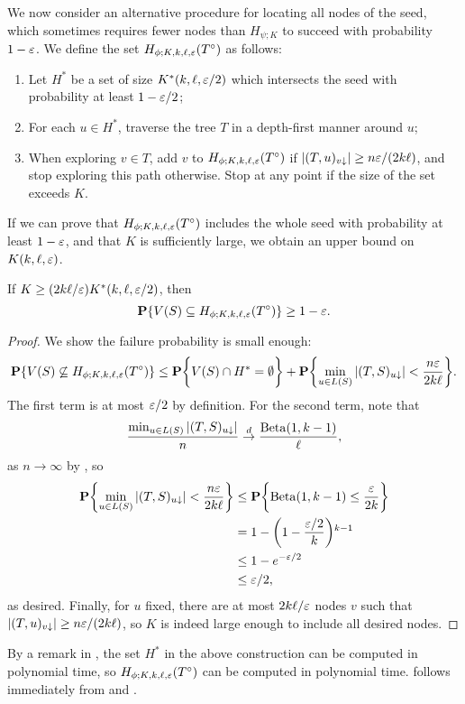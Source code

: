 We now consider an alternative procedure for locating all nodes of the
seed, which sometimes requires fewer nodes than $H_{\psi; K}$ to
succeed with probability $1 - \varepsilon$. We define the set
$H_{\phi; K, k, \ell, \varepsilon}(T^\circ)$ as follows:
\begin{enumerate}[label=(\roman*)]
\item Let $H^*$ be a set of size $K^*(k, \ell, \varepsilon/2)$ which
  intersects the seed with probability at least $1 - \varepsilon/2$;
\item For each $u \in H^*$, traverse the tree $T$ in a depth-first
  manner around $u$;
\item When exploring $v \in T$, add $v$ to
  $H_{\phi; K, k, \ell, \varepsilon}(T^\circ)$ if
  $|(T, u)_{v \downarrow}| \ge n\varepsilon/(2 k\ell)$, and stop exploring
  this path otherwise. Stop at any point if the size of the set
  exceeds $K$.
\end{enumerate}
If we can prove that $H_{\phi; K, k, \ell, \varepsilon}(T^\circ)$ includes
the whole seed with probability at least $1 - \varepsilon$, and that $K$ is
sufficiently large, we obtain an upper bound on $K(k, \ell, \varepsilon)$.
\begin{prop}
  If $K \ge (2k \ell/\varepsilon) K^*(k, \ell, \varepsilon/2)$, then
  \[
    \operatorname{\mathbf{P}}\{V(S) \subseteq H_{\phi; K, k, \ell, \varepsilon}(T^\circ)\} \ge 1 -
    \varepsilon .
  \]
\end{prop}
\begin{proof}
  We show the failure probability is small enough:
  \begin{align*}
    \operatorname{\mathbf{P}}\{V(S) \not\subseteq H_{\phi; K, k, \ell, \varepsilon}(T^\circ)\} \le \operatorname{\mathbf{P}}\biggl\{V(S) \cap H^* = \emptyset\biggr\} + \operatorname{\mathbf{P}}\biggl\{\min_{u \in L(S)} |(T, S)_{u \downarrow}| < \frac{n\varepsilon}{2 k \ell}\biggr\} .
  \end{align*}
  The first term is at most $\varepsilon/2$ by definition. For the second
  term, note that
  \[
    \frac{\min_{u \in L(S)} |(T, S)_{u \downarrow}|}{n} \overset{d}{\to} \frac{\operatorname{Beta}(1, k - 1)}{\ell} ,
  \]
  as $n \to \infty$ by , so
  \begin{align*}
    \Pr\biggl\{\min_{u \in L(S)} |(T, S)_{u \downarrow}| < \frac{n \eps}{2k \ell}\biggr\} &\le \Pr\biggl\{\Beta(1, k - 1) \le \frac{\eps}{2k}\biggr\} \\
                                                                      &= 1 - \left(1 - \frac{\eps/2}{k}\right)^{k - 1} \\
                                                                                 &\le 1 - e^{-\eps/2} \\
                                                                                 &\le \eps/2 ,
  \end{align*}
  as desired. Finally, for $u$ fixed, there are at most
  $2 k \ell/\varepsilon$ nodes $v$ such that
  $|(T, u)_{v \downarrow}| \ge n\varepsilon/(2k\ell)$, so $K$ is indeed large
  enough to include all desired nodes.
\end{proof}
By a remark in , the set $H^*$ in the above construction
can be computed in polynomial time, so
$H_{\phi; K, k, \ell, \varepsilon}(T^\circ)$ can be computed in polynomial
time.  follows immediately from
 and .
